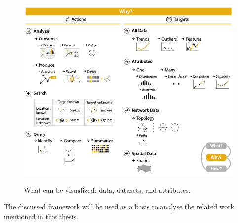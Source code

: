\begin{figure}[!htb]
\centering
\includegraphics[height=10cm,keepaspectratio]{images/basics/why.png}
\caption[
    What can be visualized: data, datasets, and attributes .
]{What can be visualized: data, datasets, and attributes.}
\label{fig:why}
\end{figure}

The discussed framework will be used as a basis to analyse the related work mentioned in this thesis.

